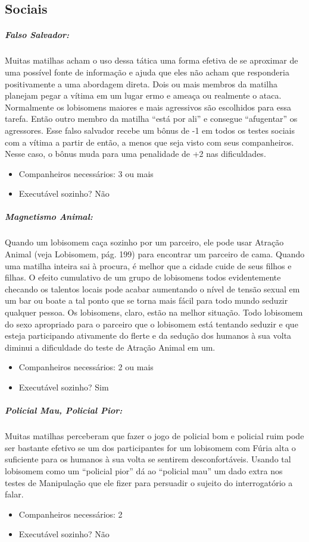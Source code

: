 \begin{multicols}{2}
\subsection{Sociais}

\subparagraph{\bf Falso Salvador:}
Muitas matilhas acham o uso dessa tática uma forma efetiva de se aproximar de uma possível fonte de informação e ajuda que eles não acham que responderia positivamente a uma abordagem direta. Dois ou mais membros da matilha planejam pegar a vítima em um lugar ermo e ameaça ou realmente o ataca. Normalmente os lobisomens maiores e mais agressivos são escolhidos para essa tarefa. Então outro membro da matilha “está por ali” e consegue “afugentar” os agressores. Esse falso salvador recebe um bônus de -1 em todos os testes sociais com a vítima a partir de então, a menos que seja visto com seus companheiros. Nesse caso, o bônus muda para uma penalidade de +2 nas dificuldades.
\begin{itemize}[noitemsep]
\item Companheiros necessários: 3 ou mais
\item Executável sozinho? Não
\end{itemize}

\subparagraph{\bf Magnetismo Animal:}
Quando um lobisomem caça sozinho por um parceiro, ele pode usar Atração Animal (veja Lobisomem, pág. 199) para encontrar um parceiro de cama. Quando uma matilha inteira sai à procura, é melhor que a cidade cuide de seus filhos e filhas. O efeito cumulativo de um grupo de lobisomens todos evidentemente checando os talentos locais pode acabar aumentando o nível de tensão sexual em um bar ou boate a tal ponto que se torna mais fácil para todo mundo seduzir qualquer pessoa. Os lobisomens, claro, estão na melhor situação. Todo lobisomem do sexo apropriado para o parceiro que o lobisomem está tentando seduzir e que esteja participando ativamente do flerte e da sedução dos humanos à sua volta diminui a dificuldade do teste de Atração Animal em um. 
\begin{itemize}[noitemsep]
\item Companheiros necessários: 2 ou mais
\item Executável sozinho? Sim
\end{itemize}

\subparagraph{\bf Policial Mau, Policial Pior:}
Muitas matilhas perceberam que fazer o jogo de policial bom e policial ruim pode ser bastante efetivo se um dos participantes for um lobisomem com Fúria alta o suficiente para os humanos à sua volta se sentirem desconfortáveis. Usando tal lobisomem como um “policial pior” dá ao “policial mau” um dado extra nos testes de Manipulação que ele fizer para persuadir o sujeito do interrogatório a falar. 
\begin{itemize}[noitemsep]
\item Companheiros necessários: 2
\item Executável sozinho? Não
\end{itemize}

\end{multicols}